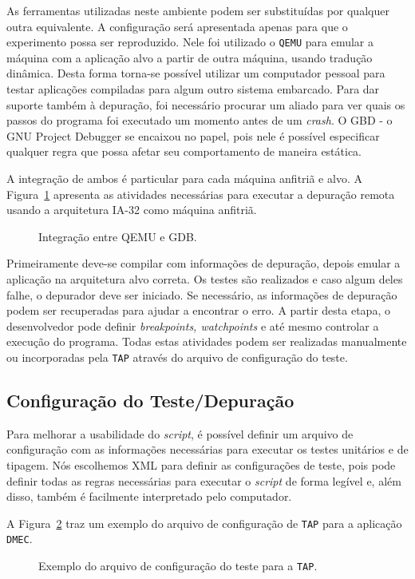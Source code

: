 \documentclass[conference]{IEEEtran}
\newcommand{\fig}[4][h]{
  \begin{figure}[#1] {\centering{\texttt{[image: fig/\#2]}}\par}
    \caption{#3\label{fig:#2}}
  \end{figure}
}
\newcommand{\progxml}[3][h]{
 \begin{figure}[#1]
     
   \caption{#3\label{progxml:#2}}
 \end{figure}
}
\begin{document}
As ferramentas utilizadas neste ambiente podem ser substituídas por qualquer outra equivalente. A configuração será apresentada apenas para que o experimento possa ser reproduzido. Nele foi utilizado o \texttt{QEMU} para emular a máquina com a aplicação alvo a partir de outra máquina, usando tradução dinâmica. Desta forma torna-se possível utilizar um computador pessoal para testar aplicações compiladas para algum outro sistema embarcado. Para dar suporte também à depuração, foi necessário procurar um aliado para ver quais os passos do programa foi executado um momento antes de um \textit{crash}. O GBD - o GNU Project Debugger se encaixou no papel, pois nele é possível especificar qualquer regra que possa afetar seu comportamento de maneira estática.
 
A integração de ambos é particular para cada máquina anfitriã e alvo. A Figura~\ref{fig:qemu_gdb_gray} apresenta as atividades necessárias para executar a depuração remota usando a arquitetura IA-32 como máquina anfitriã.

\fig{qemu_gdb_gray}{Integração entre QEMU e GDB.}{scale=.3}

Primeiramente deve-se compilar com informações de depuração, depois emular a aplicação na arquitetura alvo correta. Os testes são realizados e caso algum deles falhe, o depurador deve ser iniciado. Se necessário, as informações de depuração podem ser recuperadas para ajudar a encontrar o erro. A partir desta etapa, o desenvolvedor pode definir \textit{breakpoints, watchpoints} e até mesmo controlar a execução do programa. Todas estas atividades podem ser realizadas manualmente ou incorporadas pela \texttt{TAP} através do arquivo de configuração do teste.

\subsection{Configuração do Teste/Depuração}
Para melhorar a usabilidade do \textit{script}, é possível definir um arquivo de configuração com as informações necessárias para executar os testes unitários e de tipagem. Nós escolhemos XML para definir as configurações de teste, pois pode definir todas as regras necessárias para executar o \textit{script} de forma legível e, além disso, também é facilmente interpretado pelo computador.

A Figura~\ref{progxml:philosopher_xml} traz um exemplo do arquivo de configuração de \texttt{TAP} para a aplicação \texttt{DMEC}.

\progxml{philosopher_xml}{Exemplo do arquivo de configuração do teste para a \texttt{TAP}.}
\end{document}
